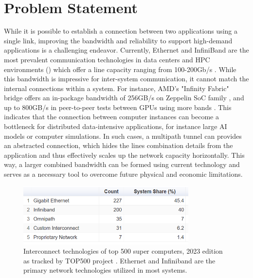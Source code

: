 
\section{Problem Statement}\label{sec:introduction:problem_statement}
While it is possible to establish a connection between two applications using a single link, improving the bandwidth and reliability to support high-demand applications is a challenging endeavor. 
Currently, Ethernet and InfiniBand are the most prevalent communication technologies in data centers and \ac{HPC} environments () which offer a line capacity ranging from 100-200Gb/s \cite{ethernet_roadmap}\cite{infiniband_roadmap}. 
While this bandwidth is impressive for inter-system communication, it cannot match the internal connections within a system. 
For instance, AMD's "Infinity Fabric" bridge offers an in-package bandwidth of 256GB/s on Zeppelin SoC family \cite{burd_zeppelin_2019}, and up to 800GB/s in peer-to-peer tests between GPUs using more bands \cite{amd_infinity_architecture}.
This indicates that the connection between computer instances can become a bottleneck for distributed data-intensive applications, for instance large \ac{AI} models or computer simulations. 
In such cases, a multipath tunnel can provides an abstracted connection, which hides the lines combination details from the application and thus effectively scales up the network capacity horizontally.
This way, a larger combined bandwidth can be formed using current technology and serves as a necessary tool to overcome future physical and economic limitations. 

\begin{figure}[H]
	\centering
	\includegraphics[width=0.8\textwidth]{resources/images/Interconnect_Technologies_500_supercomp.PNG}
	\caption{Interconnect technologies of top 500 super computers, 2023 edition as tracked by TOP500 project \cite{Interconnect_Technologies_500_supercomp}. Ethernet and Infiniband are the primary network technologies utilized in most systems.}
    \label{fig:introduction:Interconnect_Technologies_500_supercomp}
\end{figure}

